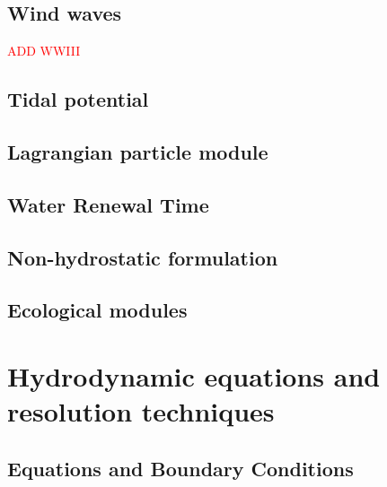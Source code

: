 \documentclass{report}
\begin{document}
	\section{Wind waves}\textcolor{red}{ADD WWIII}
	

	\section{Tidal potential}
	

	\section{Lagrangian particle module}
	


	\section{Water Renewal Time}
	

	\section{Non-hydrostatic formulation}
	

      \section{Ecological modules}
	\label{eco}
	



\appendix
\chapter{Hydrodynamic equations and resolution techniques}

      \section{Equations and Boundary Conditions}
	
\end{document}
